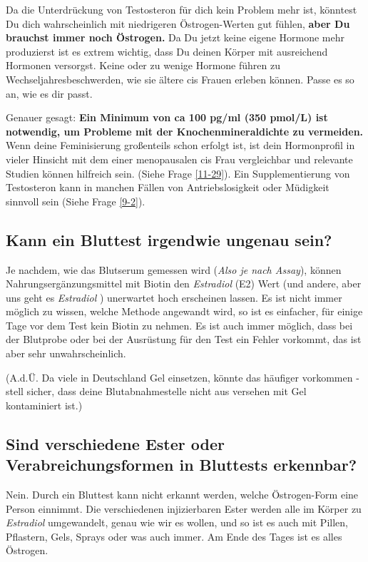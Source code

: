\documentclass{article}
\begin{document}
{Da die Unterdrückung von Testosteron für dich kein Problem mehr ist, könntest Du dich wahrscheinlich mit niedrigeren Östrogen-Werten gut fühlen, \textbf{aber Du brauchst immer noch Östrogen.} Da Du jetzt keine eigene Hormone mehr produzierst ist es extrem wichtig, dass Du deinen Körper mit ausreichend Hormonen versorgst. Keine oder zu wenige Hormone führen zu Wechseljahresbeschwerden, wie sie ältere cis Frauen erleben können. Passe es so an, wie es dir passt.

Genauer gesagt: \textbf{Ein Minimum von ca 100 pg/ml (350 pmol/L) ist notwendig, um Probleme mit der Knochenmineraldichte zu vermeiden.} Wenn deine Feminisierung großenteils schon erfolgt ist, ist dein Hormonprofil in vieler Hinsicht mit dem einer menopausalen cis Frau vergleichbar und relevante Studien können hilfreich sein. (Siehe Frage \ref{11-29}). Ein Supplementierung von Testosteron kann in manchen Fällen von Antriebslosigkeit oder Müdigkeit sinnvoll sein (Siehe Frage \ref{9-2}).

\subsection{Kann ein Bluttest irgendwie ungenau sein?}

Je nachdem, wie das Blutserum gemessen wird (\textit{Also je nach Assay}), können Nahrungsergänzungsmittel mit Biotin den \textit{Estradiol} (E2) Wert (und andere, aber uns geht es \textit{Estradiol }) unerwartet hoch erscheinen lassen. Es ist nicht immer möglich zu wissen, welche Methode angewandt wird, so ist es einfacher, für einige Tage vor dem Test kein Biotin zu nehmen. Es ist auch immer möglich, dass bei der Blutprobe oder bei der Ausrüstung für den Test ein Fehler vorkommt, das ist aber sehr unwahrscheinlich.

(A.d.Ü. Da viele in Deutschland Gel einsetzen, könnte das häufiger vorkommen - stell sicher, dass deine Blutabnahmestelle nicht aus versehen mit Gel kontaminiert ist.)

\subsection{Sind verschiedene Ester oder Verabreichungsformen in Bluttests erkennbar?}\label{4-16}

Nein. Durch ein Bluttest kann nicht erkannt werden, welche Östrogen-Form eine Person einnimmt. Die verschiedenen injizierbaren Ester werden alle im Körper zu \textit{Estradiol } umgewandelt, genau wie wir es wollen, und so ist es auch mit Pillen, Pflastern, Gels, Sprays oder was auch immer. Am Ende des Tages ist es alles Östrogen.

}
\end{document}
